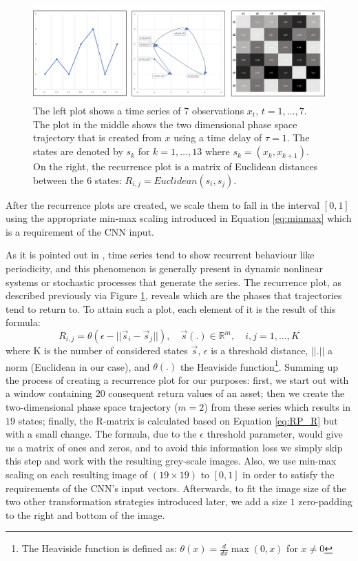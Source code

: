 \documentclass[11pt, a4paper]{article}
\begin{document}
\begin{figure}[ht]
    \centering
    \includegraphics[width=\textwidth]{images/RP.PNG}
    \caption{The left plot shows a time series of 7 observations $x_t$, $t=1,\dots,7$. The plot in the middle shows the two dimensional phase space trajectory that is created from $x$ using a time delay of $\tau = 1$. The states are denoted by $s_k$ for $k=1,\dots,13$ where $s_k = (x_k, x_{k+1})$. On the right, the recurrence plot is a matrix of Euclidean distances between the 6 states: $R_{i,j} = Euclidean(s_i,s_j)$.}
    \label{fig:RP_Def}
\end{figure}

After the recurrence plots are created, we scale them to fall in the interval $[0, 1]$ using the appropriate min-max scaling introduced in Equation \ref{eq:minmax} which is a requirement of the CNN input. 

As it is pointed out in \cite{hatami2018classification}, time series tend to show recurrent behaviour like periodicity, and this phenomenon is generally present in dynamic nonlinear systems or stochastic processes that generate the series. The recurrence plot, as described previously via Figure \ref{fig:RP_Def}, reveals which are the phases that trajectories tend to return to. To attain such a plot, each element of it is the result of this formula:
\begin{equation}
\label{eq:RP_R}
    R_{i,j} = \theta(\epsilon-||\vec{s}_i - \vec{s}_j||),\quad \vec{s}(.) \in \mathbb{R}^m, \quad i,j = 1,\dots,K
\end{equation}
where K is the number of considered states $\vec{s}$, $\epsilon$ is a threshold distance, $||.||$ a norm (Euclidean in our case), and $\theta(.)$ the Heaviside function\footnote{The Heaviside function is defined as: $\theta(x) = \frac{d}{dx}\max(0,x)$ for $x \neq 0$}. Summing up the process of creating a recurrence plot for our purposes: first, we start out with a window containing $20$ consequent return values of an asset; then we create the two-dimensional phase space trajectory ($m=2$) from these series which results in $19$ states; finally, the R-matrix is calculated based on Equation \ref{eq:RP_R} but with a small change. The formula, due to the $\epsilon$ threshold parameter, would give us a matrix of ones and zeros, and to avoid this information loss we simply skip this step and work with the resulting grey-scale images. Also, we use min-max scaling on each resulting image of $(19 \times 19)$ to $[0, 1]$ in order to satisfy the requirements of the CNN's input vectors. Afterwards, to fit the image size of the two other transformation strategies introduced later, we add a size $1$ zero-padding to the right and bottom of the image.
\end{document}

